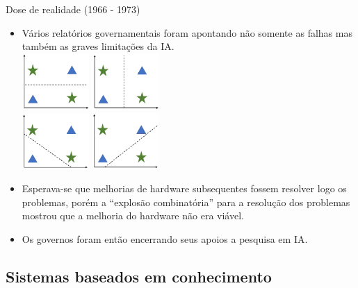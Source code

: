 \documentclass{libs/ufc_format}
\begin{document}
\begin{frame}{Dose de realidade (1966 - 1973)}
    \begin{itemize}
        \justifying
        \item Vários relatórios governamentais foram apontando não somente as falhas mas também as graves limitações da IA.\\
        \centering
        \includegraphics[width=0.2\textwidth]{figuras/perceptron_1}
        \includegraphics[width=0.2\textwidth]{figuras/perceptron_2}\\
        \includegraphics[width=0.2\textwidth]{figuras/perceptron_3}
        \includegraphics[width=0.2\textwidth]{figuras/perceptron_4}\\
        \justifying
        \item Esperava-se que melhorias de hardware subsequentes fossem resolver logo os problemas, porém a ``explosão combinatória'' para a resolução dos problemas mostrou que a melhoria do hardware não era viável.
        \item<2> Os governos foram então encerrando seus apoios a pesquisa em IA.
    \end{itemize}
\end{frame}

\subsection{Sistemas baseados em conhecimento}
\end{document}
